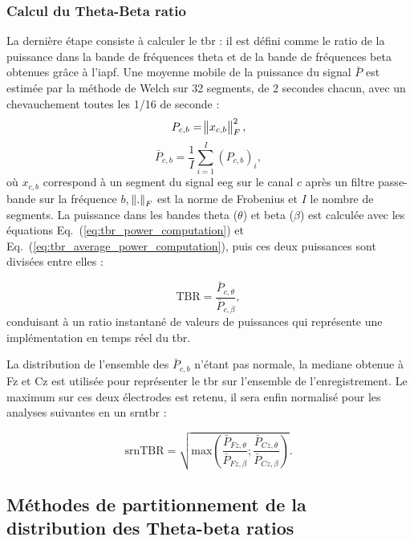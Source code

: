 \subsubsection{Calcul du Theta-Beta ratio}
La dernière étape consiste à calculer le \gls{tbr} : il est défini comme le ratio de la puissance dans la bande de fréquences theta et de la bande de fréquences beta obtenues 
grâce à l'\gls{iapf}. Une moyenne mobile de la puissance du signal $\bar{P}$ est estimée par la méthode de Welch \citep{Welch1967} sur 32 segments, de 2 secondes chacun, avec un 
chevauchement toutes les 1/16 de seconde :
\begin{equation}
\label{eq:tbr_power_computation}
P_{c,b} = \norm{ x_{c,b} }_{F}^2,
\end{equation}
\begin{equation}
\label{eq:tbr_average_power_computation}
\bar{P}_{c,b} = \frac{1}{I} \sum_{i=1}^{I} (P_{c,b})_{i},
\end{equation}
où $x_{c,b}$ correspond à un segment du signal \gls{eeg} sur le canal $c$ après un filtre passe-bande sur la fréquence $b$, $\norm{.}_{F}$ est la norme de Frobenius et $I$ 
le nombre de segments. La puissance dans les bandes theta ($\theta$) et beta ($\beta$) est calculée avec les équations Eq.~(\ref{eq:tbr_power_computation}) et Eq.~(\ref{eq:tbr_average_power_computation}),
puis ces deux puissances sont divisées entre elles :

\begin{equation}
\label{eq:tbr_tbr_computation}
\text{TBR} = \frac{\bar{P}_{c,\theta}}{\bar{P}_{c,\beta}},
\end{equation}
conduisant à un ratio instantané de valeurs de puissances qui représente une implémentation en temps réel du \gls{tbr}.

La distribution de l'ensemble des $\bar{P}_{c,b}$ n'étant pas normale, la mediane obtenue à Fz et Cz est utilisée pour représenter le \gls{tbr} sur l'ensemble 
de l'enregistrement. Le maximum sur ces deux électrodes est retenu, il sera enfin normalisé pour les analyses suivantes en un \gls{srntbr} :

\begin{equation}
\label{eq:tbr_srntbr_computation}
\text{srnTBR} = \sqrt{ \text{max}(\frac{\bar{P}_{Fz,\theta}}{\bar{P}_{Fz,\beta} } ; \frac{\bar{P}_{Cz,\theta}}{\bar{P}_{Cz,\beta}} ) }.
\end{equation}

\subsection{Méthodes de partitionnement de la distribution des Theta-beta ratios} \label{clustering}


